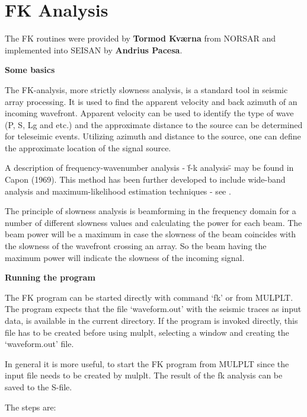 
\section{FK Analysis} 
\label{sect:fk-analysis}

The FK routines were provided by \textbf{Tormod Kv\ae rna} from NORSAR and 
implemented into SEISAN by \textbf{Andrius Pacesa}. 

\textbf{Some basics}

The FK-analysis, more strictly slowness analysis, is a standard tool in seismic array processing. It is used to find the apparent velocity and back azimuth of an incoming wavefront. Apparent velocity can be used to identify the type of wave (P, S, Lg and etc.) and the approximate distance to the source can be determined for teleseimic events. Utilizing azimuth and distance to the source, one can define the approximate location of the signal source. 

A description of frequency-wavenumber analysis - \"f-k analysis\" - may be found in Capon (1969). This method has been further developed to include wide-band analysis and maximum-likelihood estimation techniques - see \citet{kvaerna1986}. 

The principle of slowness analysis is beamforming in the frequency domain for a number of different slowness values and calculating the power for each beam. The beam power will be a maximum in case the slowness of the beam coincides with the slowness of the wavefront crossing an array. So the beam having the maximum power will indicate the slowness of the incoming signal. 

\textbf{Running the program}

The FK program can be started directly with command `fk' or from MULPLT. The program expects that the file `waveform.out' with the seismic traces as input data, is available in the current directory. If the program is invoked directly, this file has to be created before using mulplt, selecting a window and creating the `waveform.out' file. 

In general it is more useful, to start the FK program from MULPLT since the input file needs to be created by mulplt. The result of the fk analysis can be saved to the S-file. 

The steps are: 

